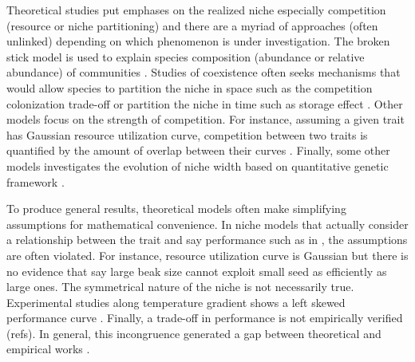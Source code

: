 Theoretical studies put emphases on the realized niche especially competition (resource or niche partitioning) and there are a myriad of approaches (often unlinked) depending on which phenomenon is under investigation.  
The broken stick model is used to explain species composition (abundance or relative abundance) of communities \citep{MacArthur1957} .
Studies of coexistence often seeks mechanisms that would allow species to partition the niche in space such as the competition colonization trade-off \citep[e.g.,][]{Levins1971,Tilman1994} or partition the niche in time such as storage effect \citep{Skellam1951, Chesson2000}. %
Other models focus on the strength of competition.
For instance, assuming a given trait has Gaussian resource utilization curve, competition  between two traits is quantified by the amount of overlap between their curves \citep{MacArthur1967, Roughgarden1979}.%
Finally, some other models investigates the evolution of niche width based on quantitative genetic framework \citep[reviewed in][]{Futuyma1988}.

To produce general results, theoretical models often make simplifying assumptions for mathematical convenience.
In niche models that actually consider a relationship between the trait and say performance such as in \citet{Roughgarden1979}, the assumptions are often violated.
For instance, resource utilization curve is Gaussian but there is no evidence that say large beak size cannot exploit small seed as efficiently as large ones. %
The symmetrical nature of the niche is not necessarily true.
Experimental studies  along temperature gradient shows a left skewed performance curve \citep{Angilletta2009}.
Finally, a trade-off in performance is not empirically verified (refs). %
In general, this incongruence generated a gap between theoretical and empirical works \citep{Amarasekare2003}.

